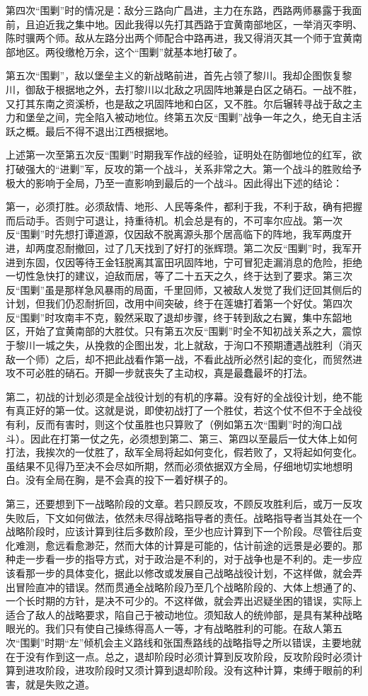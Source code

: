 第四次“围剿”时的情况是：敌分三路向广昌进，主力在东路，西路两师暴露于我面前，且迫近我之集中地。因此我得以先打其西路于宜黄南部地区，一举消灭李明、陈时骥两个师。敌从左路分出两个师配合中路再进，我又得消灭其一个师于宜黄南部地区。两役缴枪万余，这个“围剿”就基本地打破了。

第五次“围剿”，敌以堡垒主义的新战略前进，首先占领了黎川。我却企图恢复黎川，御敌于根据地之外，去打黎川以北敌之巩固阵地兼是白区之硝石。一战不胜，又打其东南之资溪桥，也是敌之巩固阵地和白区，又不胜。尔后辗转寻战于敌之主力和堡垒之间，完全陷入被动地位。终第五次反“围剿”战争一年之久，绝无自主活跃之概。最后不得不退出江西根据地。

上述第一次至第五次反“围剿”时期我军作战的经验，证明处在防御地位的红军，欲打破强大的“进剿”军，反攻的第一个战斗，关系非常之大。第一个战斗的胜败给予极大的影响于全局，乃至一直影响到最后的一个战斗。因此得出下述的结论：

第一，必须打胜。必须敌情、地形、人民等条件，都利于我，不利于敌，确有把握而后动手。否则宁可退让，持重待机。机会总是有的，不可率尔应战。第一次反“围剿”时先想打谭道源，仅因敌不脱离源头那个居高临下的阵地，我军两度开进，却两度忍耐撤回，过了几天找到了好打的张辉瓒。第二次反“围剿”时，我军开进到东固，仅因等待王金钰脱离其富田巩固阵地，宁可冒犯走漏消息的危险，拒绝一切性急快打的建议，迫敌而居，等了二十五天之久，终于达到了要求。第三次反“围剿”虽是那样急风暴雨的局面，千里回师，又被敌人发觉了我们迂回其侧后的计划，但我们仍忍耐折回，改用中间突破，终于在莲塘打着第一个好仗。第四次反“围剿”时攻南丰不克，毅然采取了退却步骤，终于转到敌之右翼，集中东韶地区，开始了宜黄南部的大胜仗。只有第五次反“围剿”时全不知初战关系之大，震惊于黎川一城之失，从挽救的企图出发，北上就敌，于洵口不预期遭遇战胜利（消灭敌一个师）之后，却不把此战看作第一战，不看此战所必然引起的变化，而贸然进攻不可必胜的硝石。开脚一步就丧失了主动权，真是最蠢最坏的打法。

第二，初战的计划必须是全战役计划的有机的序幕。没有好的全战役计划，绝不能有真正好的第一仗。这就是说，即使初战打了一个胜仗，若这个仗不但不于全战役有利，反而有害时，则这个仗虽胜也只算败了（例如第五次“围剿”时的洵口战斗）。因此在打第一仗之先，必须想到第二、第三、第四以至最后一仗大体上如何打法，我挨次的一仗胜了，敌军全局将起如何变化，假若败了，又将起如何变化。虽结果不见得乃至决不会尽如所期，然而必须依据双方全局，仔细地切实地想明白。没有全局在胸，是不会真的投下一着好棋子的。

第三，还要想到下一战略阶段的文章。若只顾反攻，不顾反攻胜利后，或万一反攻失败后，下文如何做法，依然未尽得战略指导者的责任。战略指导者当其处在一个战略阶段时，应该计算到往后多数阶段，至少也应计算到下一个阶段。尽管往后变化难测，愈远看愈渺茫，然而大体的计算是可能的，估计前途的远景是必要的。那种走一步看一步的指导方式，对于政治是不利的，对于战争也是不利的。走一步应该看那一步的具体变化，据此以修改或发展自己战略战役计划，不这样做，就会弄出冒险直冲的错误。然而贯通全战略阶段乃至几个战略阶段的、大体上想通了的、一个长时期的方针，是决不可少的。不这样做，就会弄出迟疑坐困的错误，实际上适合了敌人的战略要求，陷自己于被动地位。须知敌人的统帅部，是具有某种战略眼光的。我们只有使自己操练得高人一等，才有战略胜利的可能。在敌人第五次“围剿”时期“左”倾机会主义路线和张国焘路线的战略指导之所以错误，主要地就在于没有作到这一点。总之，退却阶段时必须计算到反攻阶段，反攻阶段时必须计算到进攻阶段，进攻阶段时又须计算到退却阶段。没有这种计算，束缚于眼前的利害，就是失败之道。

